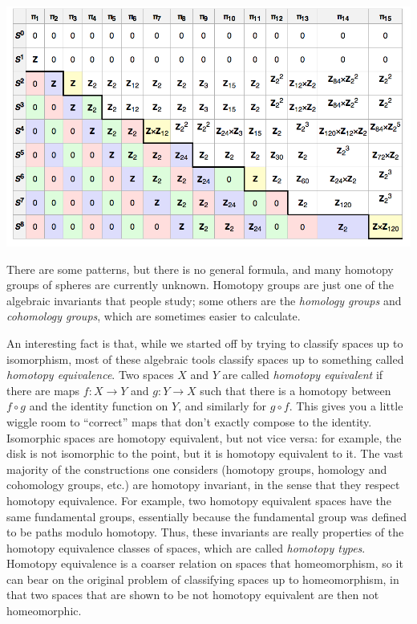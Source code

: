\par\includegraphics[width=5.5in]{spheres.png}\par

There are some patterns, but there is no general formula, and many
homotopy groups of spheres are currently unknown.  Homotopy groups are
just one of the algebraic invariants that people study; some others are
the \emph{homology groups} and \emph{cohomology groups}, which are
sometimes easier to calculate.

An interesting fact is that, while we started off by trying to classify
spaces up to isomorphism, most of these algebraic tools classify
spaces up to something called \emph{homotopy equivalence}.  Two spaces $X$ and $Y$
are called {\em homotopy equivalent} if there are maps $f : X \rightarrow Y$ and $g : Y \rightarrow X$
such that there is a homotopy between $f \circ g$ and the identity function on $Y$,
and similarly for $g \circ f$.  This gives you a little wiggle room to
``correct'' maps that don't exactly compose to the identity.
Isomorphic spaces are homotopy
equivalent, but not vice versa: for example, the disk is not isomorphic
to the point, but it is homotopy equivalent to it.  The vast majority of
the constructions one considers (homotopy groups, homology and
cohomology groups, etc.) are homotopy invariant, in the sense that they
respect homotopy equivalence.  For example, two homotopy equivalent
spaces have the same fundamental groups, essentially because the
fundamental group was defined to be paths modulo homotopy.  Thus, these
invariants are really properties of the homotopy equivalence classes of
spaces, which are called \emph{homotopy types}.  Homotopy equivalence is a coarser
relation on spaces that homeomorphism, so it can bear 
                                                         on the original
problem of classifying spaces up to homeomorphism, in that two spaces
that are shown to be not homotopy equivalent are then not homeomorphic.

